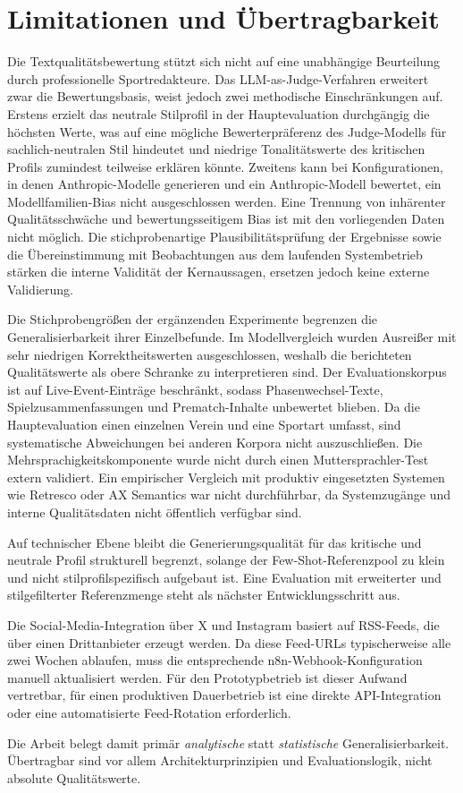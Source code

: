 \section{Limitationen und Übertragbarkeit}\label{kritische-reflexion}

Die Textqualitätsbewertung stützt sich nicht auf eine unabhängige Beurteilung durch professionelle Sportredakteure. Das LLM-as-Judge-Verfahren erweitert zwar die Bewertungsbasis, weist jedoch zwei methodische Einschränkungen auf. Erstens erzielt das neutrale Stilprofil in der Hauptevaluation durchgängig die höchsten Werte, was auf eine mögliche Bewerterpräferenz des Judge-Modells für sachlich-neutralen Stil hindeutet und niedrige Tonalitätswerte des kritischen Profils zumindest teilweise erklären könnte. Zweitens kann bei Konfigurationen, in denen Anthropic-Modelle generieren und ein Anthropic-Modell bewertet, ein Modellfamilien-Bias nicht ausgeschlossen werden. Eine Trennung von inhärenter Qualitätsschwäche und bewertungsseitigem Bias ist mit den vorliegenden Daten nicht möglich. Die stichprobenartige Plausibilitätsprüfung der Ergebnisse sowie die Übereinstimmung mit Beobachtungen aus dem laufenden Systembetrieb stärken die interne Validität der Kernaussagen, ersetzen jedoch keine externe Validierung.

Die Stichprobengrößen der ergänzenden Experimente begrenzen die Generalisierbarkeit ihrer Einzelbefunde. Im Modellvergleich wurden Ausreißer mit sehr niedrigen Korrektheitswerten ausgeschlossen, weshalb die berichteten Qualitätswerte als obere Schranke zu interpretieren sind. Der Evaluationskorpus ist auf Live-Event-Einträge beschränkt, sodass Phasenwechsel-Texte, Spielzusammenfassungen und Prematch-Inhalte unbewertet blieben. Da die Hauptevaluation einen einzelnen Verein und eine Sportart umfasst, sind systematische Abweichungen bei anderen Korpora nicht auszuschließen. Die Mehrsprachigkeitskomponente wurde nicht durch einen Muttersprachler-Test extern validiert. Ein empirischer Vergleich mit produktiv eingesetzten Systemen wie Retresco oder AX Semantics war nicht durchführbar, da Systemzugänge und interne Qualitätsdaten nicht öffentlich verfügbar sind.

Auf technischer Ebene bleibt die Generierungsqualität für das kritische und neutrale Profil strukturell begrenzt, solange der Few-Shot-Referenzpool zu klein und nicht stilprofilspezifisch aufgebaut ist. Eine Evaluation mit erweiterter und stilgefilterter Referenzmenge steht als nächster Entwicklungsschritt aus.

Die Social-Media-Integration über X und Instagram basiert auf RSS-Feeds, die über einen Drittanbieter erzeugt werden. Da diese Feed-URLs typischerweise alle zwei Wochen ablaufen, muss die entsprechende n8n-Webhook-Konfiguration manuell aktualisiert werden. Für den Prototypbetrieb ist dieser Aufwand vertretbar, für einen produktiven Dauerbetrieb ist eine direkte API-Integration oder eine automatisierte Feed-Rotation erforderlich.

Die Arbeit belegt damit primär \emph{analytische} statt \emph{statistische} Generalisierbarkeit. Übertragbar sind vor allem Architekturprinzipien und Evaluationslogik, nicht absolute Qualitätswerte.


